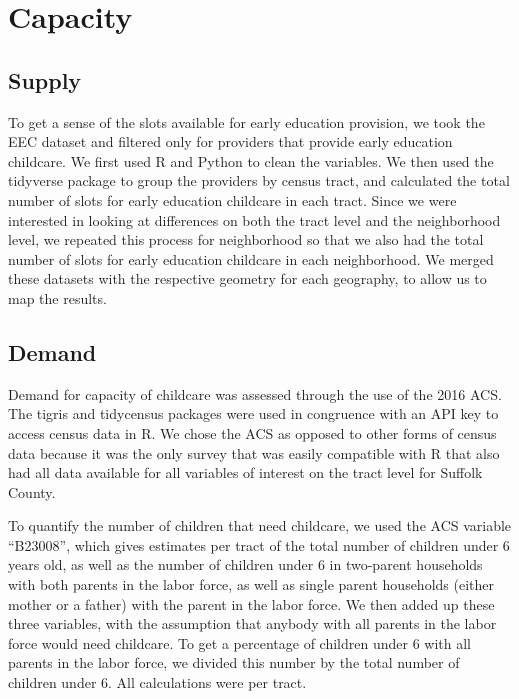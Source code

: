 \documentclass[10pt,letterpaper]{article}
\begin{document}
\section{Capacity}\label{capacity}

\subsection{Supply}\label{supply}

To get a sense of the slots available for early education provision, we
took the EEC dataset and filtered only for providers that provide early
education childcare. We first used R and Python to clean the variables.
We then used the tidyverse package to group the providers by census
tract, and calculated the total number of slots for early education
childcare in each tract. Since we were interested in looking at
differences on both the tract level and the neighborhood level, we
repeated this process for neighborhood so that we also had the total
number of slots for early education childcare in each neighborhood. We
merged these datasets with the respective geometry for each geography,
to allow us to map the results.

\subsection{Demand}\label{demand}

Demand for capacity of childcare was assessed through the use of the
2016 ACS. The tigris and tidycensus packages were used in congruence
with an API key to access census data in R. We chose the ACS as opposed
to other forms of census data because it was the only survey that was
easily compatible with R that also had all data available for all
variables of interest on the tract level for Suffolk County.

To quantify the number of children that need childcare, we used the ACS
variable ``B23008'', which gives estimates per tract of the total number
of children under 6 years old, as well as the number of children under 6
in two-parent households with both parents in the labor force, as well
as single parent households (either mother or a father) with the parent
in the labor force. We then added up these three variables, with the
assumption that anybody with all parents in the labor force would need
childcare. To get a percentage of children under 6 with all parents in
the labor force, we divided this number by the total number of children
under 6. All calculations were per tract.
\end{document}
